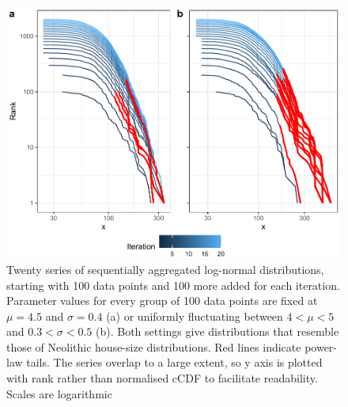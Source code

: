 \documentclass[
  12pt,
  a4paper, twoside]{book}
\begin{document}
\begin{figure}

{\centering \includegraphics[width=0.9\linewidth]{bookdown-demo_files/figure-latex/05-multi-ln-1} 

}

\caption[Aggregated log-normal distributions and power-law tails]{Twenty series of sequentially aggregated log-normal distributions, starting with 100 data points and 100 more added for each iteration. Parameter values for every group of 100 data points are fixed at \(\mu = 4.5\) and \(\sigma = 0.4\) (a) or uniformly fluctuating between \(4 < \mu < 5\) and \(0.3 < \sigma < 0.5\) (b). Both settings give distributions that resemble those of Neolithic house-size distributions. Red lines indicate power-law tails. The series overlap to a large extent, so y axis is plotted with rank rather than normalised cCDF to facilitate readability. Scales are logarithmic}\label{fig:05-multi-ln}
\end{figure}
\end{document}
